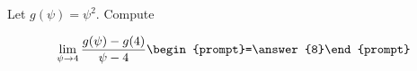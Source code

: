 \documentclass{ximera}
\author{Bart Snapp}
\begin{document}
\begin{exercise}
Let $g(\psi) = \psi ^2$. Compute

\[
\lim_{ \psi\to 4 } 
\frac{g(\psi)-g(4)}{\psi -4} \begin{prompt}=\answer{8}\end{prompt}
\]
\end{exercise}
\end{document}
